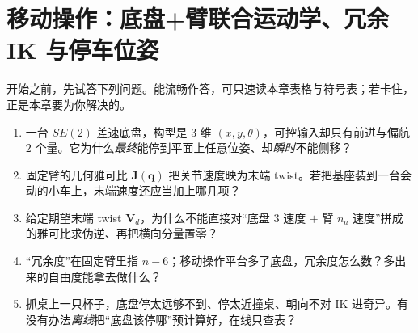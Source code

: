\chapter{移动操作：底盘+臂联合运动学、冗余 IK 与停车位姿}\label{ch:mm-kinematics}


\begin{practice}[前置自测]
开始之前，先试答下列问题。能流畅作答，可只速读本章表格与符号表；若卡住，正是本章要为你解决的。
\begin{enumerate}
  \item 一台 $SE(2)$ 差速底盘，构型是 $3$ 维 $(x,y,\theta)$，可控输入却只有前进与偏航 $2$ 个量。它为什么\emph{最终}能停到平面上任意位姿、却\emph{瞬时}不能侧移？
  \item 固定臂的几何雅可比 $\mathbf{J}(\mathbf{q})$ 把关节速度映为末端 twist。若把基座装到一台会动的小车上，末端速度还应当加上哪几项？
  \item 给定期望末端 twist $\mathbf{V}_d$，为什么不能直接对“底盘 $3$ 速度 $+$ 臂 $n_a$ 速度”拼成的雅可比求伪逆、再把横向分量置零？
  \item “冗余度”在固定臂里指 $n-6$；移动操作平台多了底盘，冗余度怎么数？多出来的自由度能拿去做什么？
  \item 抓桌上一只杯子，底盘停太远够不到、停太近撞桌、朝向不对 IK 进奇异。有没有办法\emph{离线}把“底盘该停哪”预计算好，在线只查表？
\end{enumerate}
\end{practice}


